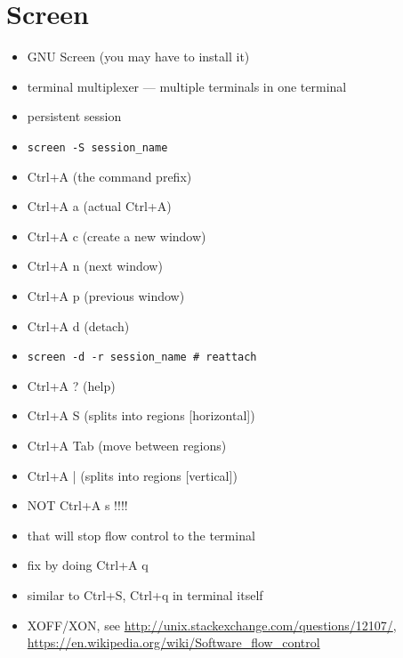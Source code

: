 \documentclass[%
        hyperref={%
                pdfauthor={Zakariyya Mughal},%
                pdfpagemode={None},pdfpagelayout={SinglePage}}%
        xcolor={x11names},%
]{beamer}
\begin{document}
\section{Screen}\frame{\insertsection}
\begin{frame}
	\begin{itemize}
\item GNU Screen (you may have to install it)
\item terminal multiplexer --- multiple terminals in one terminal
\item persistent session
\pause\item \texttt{screen -S session\_name}
\item Ctrl+A (the command prefix)
\item Ctrl+A a (actual Ctrl+A)
\item Ctrl+A c (create a new window)
\item Ctrl+A n (next window)
\item Ctrl+A p (previous window)
\item Ctrl+A d (detach)
\item \texttt{screen -d -r session\_name \# reattach}
\item Ctrl+A ? (help)
	\end{itemize}
\end{frame}
\begin{frame}
\begin{itemize}
\item Ctrl+A S (splits into regions [horizontal])
\item Ctrl+A Tab (move between regions)
\item Ctrl+A | (splits into regions [vertical])

\pause\item NOT Ctrl+A s !!!!
\item that will stop flow control to the terminal
\item \qquad	fix by doing Ctrl+A q
\pause\item similar to Ctrl+S, Ctrl+q in terminal itself
\item XOFF/XON, see \url{http://unix.stackexchange.com/questions/12107/}, \url{https://en.wikipedia.org/wiki/Software_flow_control}
\end{itemize}
\end{frame}

\end{document}
